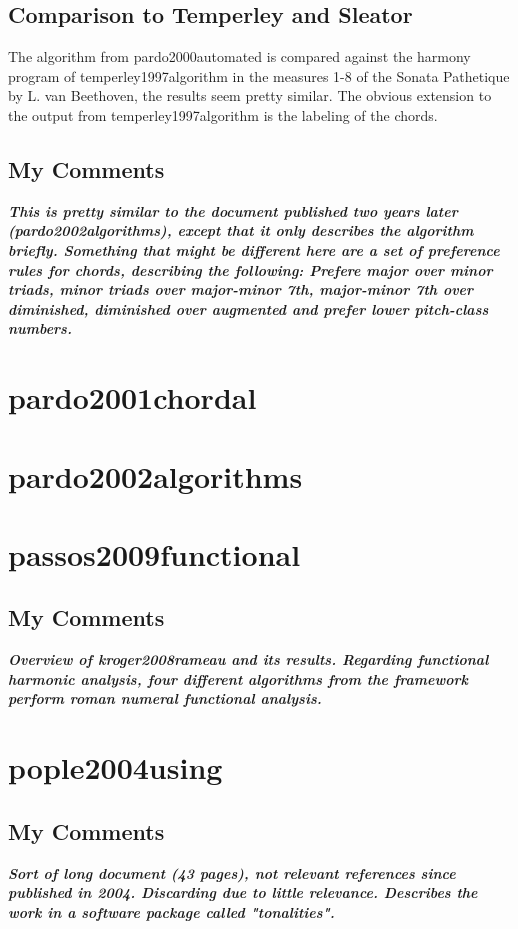   \subsection{Comparison to Temperley and Sleator}
    The algorithm from pardo2000automated is compared against the harmony program of temperley1997algorithm in the measures 1-8 of the Sonata Pathetique by L. van Beethoven, the results seem pretty similar. The obvious extension to the output from temperley1997algorithm is the labeling of the chords.
  \subsection{My Comments}
    \emph{\textbf{
      This is pretty similar to the document published two years later (pardo2002algorithms), except that it only describes the algorithm briefly. Something that might be different here are a set of preference rules for chords, describing the following: Prefere major over minor triads, minor triads over major-minor 7th, major-minor 7th over diminished, diminished over augmented and prefer lower pitch-class numbers.
    }}
\section{pardo2001chordal }
\section{pardo2002algorithms }
\section{passos2009functional }
  \subsection{My Comments}
  \emph{\textbf{
    Overview of kroger2008rameau and its results. Regarding functional harmonic analysis, four different algorithms from the framework perform roman numeral functional analysis.
  }}
\section{pople2004using }
  \subsection{My Comments}
    \emph{\textbf{
      Sort of long document (43 pages), not relevant references since published in 2004. Discarding due to little relevance. Describes the work in a software package called "tonalities".
    }
  }
